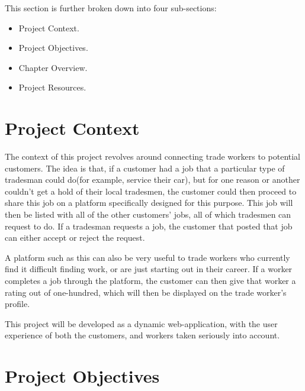 \clearpage

This section is further broken down into four sub-sections:

\begin{itemize}
    \item Project Context.
    \item Project Objectives.
    \item Chapter Overview.
    \item Project Resources.
\end{itemize}

\section{Project Context}
\label{sec:IntroductionContext}

The context of this project revolves around connecting trade workers to potential customers. The idea is that, if a customer had a job that a particular type of tradesman could do(for example, service their car), but for one reason or another couldn't get a hold of their local tradesmen, the customer could then proceed to share this job on a platform specifically designed for this purpose. This job will then be listed with all of the other customers' jobs, all of which tradesmen can request to do. If a tradesman requests a job, the customer that posted that job can either accept or reject the request.

\bigskip

A platform such as this can also be very useful to trade workers who currently find it difficult finding work, or are just starting out in their career. If a worker completes a job through the platform, the customer can then give that worker a rating out of one-hundred, which will then be displayed on the trade worker's profile. 

\bigskip

This project will be developed as a dynamic web-application, with the user experience of both the customers, and workers taken seriously into account.

\section{Project Objectives}
\label{sec:IntroductionObjectives}


